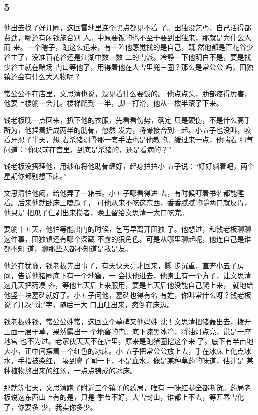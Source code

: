 {\centering\subsection{5}}

他出去找了好几圈，这回雪地里连个黑点都见不着
了。田独没乞丐，自己活得都费劲，哪还有闲钱施合别
人。中原要饭的也不至于要到田独来，那就是为什么人而
来。一个瞎子，跑这么远来，有一阵他感觉找的是自己，既
然他都是百花谷少谷主了，没准百花谷还是江湖中数一数
二的门派。冷静一下他明白不是，要是找少谷主就在赌场
门口等他了，用得着他在大雪里兜三圈？那么是常公公
吗，田独镇还会有什么大人物呢？

常公公不在店里，文思清也说，没见着什么要饭的。
他点点头，肋部疼得厉害，他要上楼躺一会儿。楼梯爬到
一半，脚一打滑，他从一楼半滚了下来。

钱老板晚一点回来，扒下他的衣服，先看看伤势，确定
只是硬伤，不是什么高手所为，他捏着折成两半的肋骨，忽然
发力，将骨接合到一起。小五子也没叫，咬着牙忍了半天，想
着杀猪剔骨那一套手法也是他教的。缓过来一点，他喘着
粗气问道：“你以前在宫里，到底是杀猪的，还是看病的？”

钱老板没搭理他，用纱布将他助骨缠好，起身拍拍小
五子说：“好好躺着吧，两个星期你都别想下床。”

文思清怕他闷，给他弄了一箱书。小五子哪看得进
去，有时候盯着书名都能睡着。后来他就卧床上嗑瓜子，
可他从来不吃这东西，香香腻腻的嚼两口就反胃，他只是
把瓜子仁剥出来攒者，晚上留给文思清一大口吃完。

要躺十五天，他怕等能出门的时候，乞丐早离开田独
了。他想过，和钱老板聊聊这件事，田独镇还有哪个深藏
不露的狠角色。可是从哪里聊起呢，他连自己是谁都不知
道，聊那些人都不知道是敌是友。

他还在犹豫，钱老板先出事了，有天快天亮才回来，脚
步沉重，直奔小五子房间，告诉他猪圈底下有一个地窖，一
会扶他进去，他身上有一个方子，让文思清这几天把药凑
齐，等他七天后上来服用，要是七天后他没能自己爬上来，
就地给他竖一块墓碑就好了。小五子问他，墓碑也得有名
有姓，你叫常什么呀？钱老板说了几次“沈”字，随后一大
口血吐出来，瘫倒在床边。

钱老板姓钱，常公公姓常，这回立个墓碑又他妈姓
沈！文思清把猪轰出去，拨开上面一层干草，果然露出一
个地窖的门。底下漆黑冰冷，将油灯点亮，说是一座地宫
也不为过。老家伙天天不在店里，原来是跑猪圈挖这个来
了。底下有半亩地大小，正中间摆着一个红色的冰床。小
五子把常公公放上去，手在冰床上化点冰水，手指被染红，
凑到鼻子闻一下，不是血水，像是某种草药的味道，估计是
某种植物熬出来的红汤，一点点铸成的冰床。

那就等七天，文思清跑了附近三个镇子的药局，唯有
一味红参全都断货。药局老板说这东西山上有的是，只是
季节不好，大雪封山，谁都上不去，等开春雪化了，你要多
少，我卖你多少。

